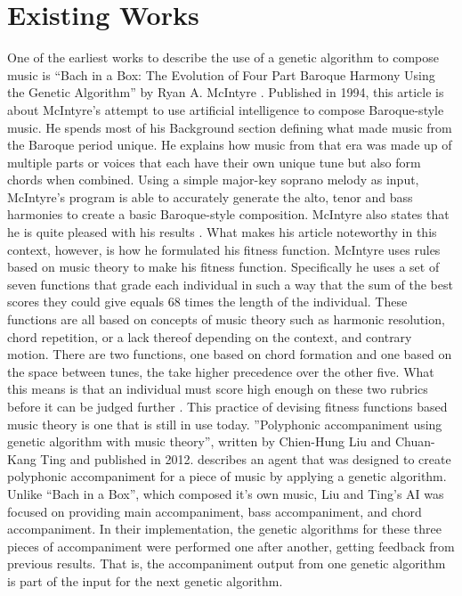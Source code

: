 \documentclass[conference]{IEEEtran}
\begin{document}
\section{Existing Works}
One of the earliest works to describe the use of a genetic algorithm to compose music is “Bach in a Box: The Evolution of Four Part Baroque Harmony Using the Genetic Algorithm” by Ryan A. McIntyre \cite{b2}. Published in 1994, this article is about McIntyre's attempt to use artificial intelligence to compose Baroque-style music. He spends most of his Background section defining what made music from the Baroque period unique. He explains how music from that era was made up of multiple parts or voices that each have their own unique tune but also form chords when combined. Using a simple major-key soprano melody as input, McIntyre's program is able to accurately generate the alto, tenor and bass harmonies to create a basic Baroque-style composition. McIntyre also states that he is quite pleased with his results \cite{b2}. What makes his article noteworthy in this context, however, is how he formulated his fitness function.
McIntyre uses rules based on music theory to make his fitness function. Specifically he uses a set of seven functions that grade each individual in such a way that the sum of the best scores they could give equals 68 times the length of the individual. These functions are all based on concepts of music theory such as harmonic resolution, chord repetition, or a lack thereof depending on the context, and contrary motion. There are two functions, one based on chord formation and one based on the space between tunes, the take higher precedence over the other five. What this means is that an individual must score high enough on these two rubrics before it can be judged further \cite{b2}.  This practice of devising fitness functions based music theory is one that is still in use today.
”Polyphonic accompaniment using genetic algorithm with music theory”, written by Chien-Hung Liu and Chuan-Kang Ting and published in 2012. describes an agent that was designed to create polyphonic accompaniment for a piece of music by applying a genetic algorithm\cite{b1}.  Unlike “Bach in a Box”, which composed it’s own music, Liu and Ting’s AI was focused on providing main accompaniment, bass accompaniment, and chord accompaniment\cite{b1}. In their implementation, the genetic algorithms for these three pieces of accompaniment were performed one after another, getting feedback from previous results. That is, the accompaniment output from one genetic algorithm is part of the input for the next genetic algorithm.
\end{document}
